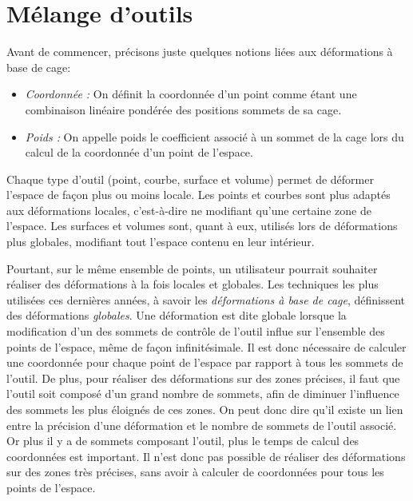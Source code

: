 
\chapter{Mélange d'outils}

\graphicspath{ {Chapter2/Chapter2Figs/PNG/}
  {Chapter2/Chapter2Figs/PDF/} {Chapter2/Chapter2Figs/} }

Avant de commencer, précisons juste quelques notions liées aux
déformations à base de cage:
\begin{itemize}
\item{\textit{Coordonnée :}} On définit la coordonnée d'un point comme
  étant une combinaison linéaire pondérée des positions sommets de sa
  cage.
\item{\textit{Poids :}} On appelle poids le coefficient associé à un
  sommet de la cage lors du calcul de la coordonnée d'un point de
  l'espace.\\
\end{itemize}

Chaque type d'outil (point, courbe, surface et volume) permet de
déformer l'espace de façon plus ou moins locale. Les points et courbes
sont plus adaptés aux déformations locales, c'est-à-dire ne modifiant
qu'une certaine zone de l'espace. Les surfaces et volumes sont, quant
à eux, utilisés lors de déformations plus globales, modifiant tout
l'espace contenu en leur intérieur.

Pourtant, sur le même ensemble de points, un utilisateur pourrait
souhaiter réaliser des déformations à la fois locales et globales. Les
techniques les plus utilisées ces dernières années, à savoir les
\textit{déformations à base de cage}, définissent des déformations
\textit{globales}. Une déformation est dite globale lorsque la
modification d'un des sommets de contrôle de l'outil influe sur
l'ensemble des points de l'espace, même de façon infinitésimale. Il
est donc nécessaire de calculer une coordonnée pour chaque point de
l'espace par rapport à tous les sommets de l'outil. De plus, pour
réaliser des déformations sur des zones précises, il faut que l'outil
soit composé d'un grand nombre de sommets, afin de diminuer
l'influence des sommets les plus éloignés de ces zones. On peut donc
dire qu'il existe un lien entre la précision d'une déformation et le
nombre de sommets de l'outil associé. Or plus il y a de sommets
composant l'outil, plus le temps de calcul des coordonnées est
important. Il n'est donc pas possible de réaliser des déformations sur
des zones très précises, sans avoir à calculer de coordonnées pour
tous les points de l'espace.

